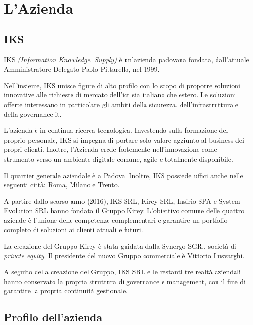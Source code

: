 
\chapter{L'Azienda}
\label{cap:azienda}
\vspace{20pt}

\section{IKS}

IKS \emph{(Information Knowledge. Supply)} è un'azienda padovana 
fondata, dall'attuale Amministratore Delegato Paolo Pittarello, nel 1999. 

Nell'insieme, IKS unisce figure di alto profilo con lo scopo di 
proporre soluzioni innovative alle richieste di mercato dell'\gls{ict} 
sia italiano che estero. Le soluzioni offerte interessano in particolare 
gli ambiti della sicurezza, dell'infrastruttura e della governance \gls{it}.  

L'azienda è in continua ricerca tecnologica. Investendo sulla formazione 
del proprio personale, IKS si impegna di portare solo valore aggiunto 
al business dei propri clienti. Inoltre, l'Azienda crede fortemente 
nell'innovazione come strumento verso un ambiente digitale comune, 
\gls{agile} e totalmente disponibile. 

Il quartier generale aziendale è a Padova. Inoltre, IKS possiede uffici 
anche nelle seguenti città: Roma, Milano e Trento.

A partire dallo scorso anno (2016), IKS SRL, Kirey SRL, Insirio SPA e 
System Evolution SRL hanno  fondato il Gruppo Kirey. L'obiettivo comune 
delle quattro aziende è l'unione delle competenze complementari e 
garantire un portfolio completo di soluzioni ai clienti attuali e futuri. 

La creazione del Gruppo Kirey è stata guidata dalla Synergo SGR., società di 
\emph{private equity}. Il presidente del nuovo Gruppo commerciale è Vittorio 
Lusvarghi.   

A seguito della creazione del Gruppo, IKS SRL e le restanti tre realtà 
aziendali hanno conservato la propria struttura di governance e management, 
con il fine di garantire la propria continuità gestionale. 

\section{Profilo dell'azienda}
